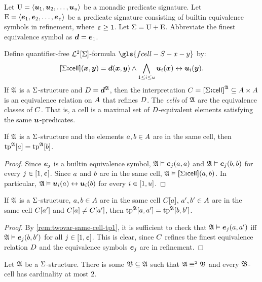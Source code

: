 
Let $\mathrm{U} = \left\langle \bm{u}_{1},\bm{u}_{2},\dots,\bm{u}_{u} \right\rangle$ be a monadic predicate signature.
Let $\mathrm{E} = \left\langle \bm{e}_{1},\bm{e}_{2},\dots,\bm{e}_{\upepsilon} \right\rangle$ be a predicate signature consisting
of builtin equivalence symbols in refinement, where $\upepsilon \geq 1$.
Let $\mathrm{\Sigma} = \mathrm{U} + \mathrm{E}$.
Abbreviate the finest equivalence symbol as $\bm{d} = \bm{e}_{1}$.
\begin{definition}
Define quantifier-free $\mathcal{L}^{2}[\mathrm{\Sigma}]$-formula $\gls{fcell-S-x-y}$ by:
\[
  {\bm{[}\mathrm{\Sigma}\mathord{\bm{:}}\mathsf{cell}\bm{]}}(\bm{x},\bm{y}) = \bm{d}(\bm{x},\bm{y}) \land
  \bigwedge_{1 \leq i \leq u} \bm{u}_{i}(\bm{x}) \leftrightarrow \bm{u}_{i}(\bm{y}).
\]
If $\mathfrak{A}$ is a $\mathrm{\Sigma}$-structure and $D = \bm{d}^{\mathfrak{A}}$, then the
interpretation $C = {\bm{[}\mathrm{\Sigma}\mathord{\bm{:}}\mathsf{cell}\bm{]}}^{\mathfrak{A}} \subseteq {A\times A}$ is an
equivalence relation on $A$ that refines $D$.
The \emph{cells} of $\mathfrak{A}$ are the equivalence classes of $C$.
That is, a cell is a maximal set of $D$-equivalent elements satisfying the
same $\bm{u}$-predicates.
\end{definition}

\begin{remark}\label{rem:twovar-same-cell-tp1}
If $\mathfrak{A}$ is a $\mathrm{\Sigma}$-structure and the elements $a, b \in A$ are in
the same cell, then $\operatorname{tp}^{\mathfrak{A}}[a] = \operatorname{tp}^{\mathfrak{A}}[b]$.
\end{remark}
\begin{proof}
Since $\bm{e}_{j}$ is a builtin equivalence symbol,
$\mathfrak{A} \vDash \bm{e}_{j}(a,a)$ and $\mathfrak{A} \vDash \bm{e}_{j}(b,b)$
for every $j \in [1,\upepsilon]$.
Since $a$ and $b$ are in the same cell,
$\mathfrak{A} \vDash {\bm{[}\mathrm{\Sigma}\mathord{\bm{:}}\mathsf{cell}\bm{]}}(a,b)$.
In particular, $\mathfrak{A} \vDash \bm{u}_{i}(a) \leftrightarrow \bm{u}_{i}(b)$ for every
$i \in [1,u]$.
\end{proof}
\begin{remark}\label{rem:twovar-same-cell-tp2}
If $\mathfrak{A}$ is a $\mathrm{\Sigma}$-structure, $a, b \in A$ are in the same cell
$C[a]$, ${a'}, {b'} \in A$ are in the same cell $C[{a'}]$ and
$C[a] \neq C[{a'}]$,
then $\operatorname{tp}^{\mathfrak{A}}[a,{a'}] = \operatorname{tp}^{\mathfrak{A}}[b,{b'}]$.
\end{remark}
\begin{proof}
By \cref{rem:twovar-same-cell-tp1}, it is sufficient to check that
$\mathfrak{A} \vDash \bm{e}_{j}(a, {a'})$ iff $\mathfrak{A} \vDash \bm{e}_{j}(b, {b'})$
for all $j \in [1,\upepsilon]$.
This is clear, since $C$ refines the finest equivalence relation $D$ and
the equivalence symbols $\bm{e}_{j}$ are in refinement.
\end{proof}

\begin{lemma}\label{lem:twovar-cell-2}
Let $\mathfrak{A}$ be a $\mathrm{\Sigma}$-structure.
There is some $\mathfrak{B} \subseteq \mathfrak{A}$ such that
$\mathfrak{A} \equiv^{2} \mathfrak{B}$ and every
$\mathfrak{B}$-cell has cardinality at most $2$.
\end{lemma}

